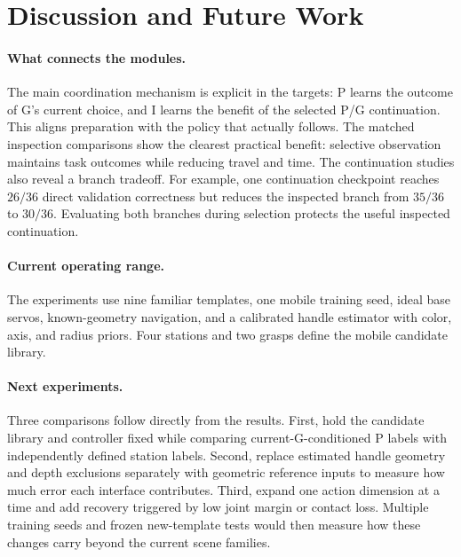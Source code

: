 \section{Discussion and Future Work}
\label{sec:discussion}
\paragraph{What connects the modules.}
The main coordination mechanism is explicit in the targets: P learns the
outcome of G's current choice, and I learns the benefit of the selected P/G
continuation. This aligns preparation with the policy that actually follows.
The matched inspection comparisons show the clearest practical benefit:
selective observation maintains task outcomes while reducing travel and time.
The continuation studies also reveal a branch tradeoff. For example, one
continuation checkpoint reaches $26/36$ direct validation correctness but reduces the
inspected branch from $35/36$ to $30/36$. Evaluating both branches during
selection protects the useful inspected continuation.

\paragraph{Current operating range.}
The experiments use nine familiar templates, one mobile training seed,
ideal base servos, known-geometry navigation, and a calibrated handle
estimator with color, axis, and radius priors. Four stations and two grasps
define the mobile candidate library.

\paragraph{Next experiments.}
Three comparisons follow directly from the results. First, hold the candidate
library and controller fixed while comparing current-G-conditioned P labels
with independently defined station labels. Second, replace estimated handle
geometry and depth exclusions separately with geometric reference inputs to
measure how much error each interface contributes. Third, expand one action
dimension at a time and add recovery triggered by low joint margin or contact
loss. Multiple training seeds and frozen new-template tests would then measure
how these changes carry beyond the current scene families.
